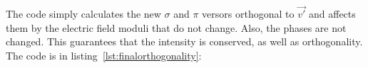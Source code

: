 \documentclass{iucr}
\newcommand{\todo}[1]{{\color{red}[TODO: "#1'']}}
\begin{document}


The code simply calculates the new $\sigma$ and $\pi$ versors orthogonal to $\vec{v'}$ and affects them by the electric field moduli that do not change. 
Also, the phases are not changed. 
This guarantees that the intensity is conserved, as well as orthogonality.
The code is in listing~\ref{lst:finalorthogonality}: 






\end{document}
